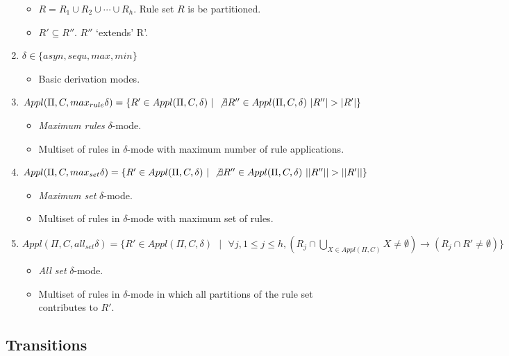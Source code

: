 \documentclass{article}
\newcommand{\s}{\text{ }}
\begin{document}
\begin{appendices}
\begin{enumerate}
\begin{itemize}
         \item $R = R_1 \cup R_2 \cup \cdots \cup R_h$. Rule set $R$ is be partitioned.
         \item $R' \subseteq R''$. $R''$ `extends' R'.
         \end{itemize}
   \item $\delta \in \{asyn, sequ, max, min\}$
         \begin{itemize}
         \item Basic derivation modes.
         \end{itemize}
   \item $Appl(\Pi, C, max_{rule}\delta) = \{R' \in Appl(\Pi, C, \delta) \s | \s \not\exists R'' \in Appl(\Pi,C, \delta) \s |R''| > |R'|\}$
         \begin{itemize}
         \item \textit{Maximum rules} $\delta$-mode.
         \item Multiset of rules in $\delta$-mode with maximum number of rule applications. 
         \end{itemize}
   \item $Appl(\Pi, C, max_{set}\delta) = \{R' \in Appl(\Pi, C, \delta) \s | \s \not\exists R'' \in Appl(\Pi,C, \delta) \s ||R''|| > ||R'||\}$
         \begin{itemize}
         \item \textit{Maximum set} $\delta$-mode.
         \item Multiset of rules in $\delta$-mode with maximum set of rules. 
         \end{itemize}
   \item $Appl(\Pi, C, all_{set}\delta) = \{R' \in Appl(\Pi, C, \delta) \s | \s \forall j, 1 \leq j \leq h, (R_j \cap \bigcup_{X \in Appl(\Pi,C)} X \neq \emptyset) \rightarrow (R_j \cap R' \neq \emptyset)\}$
         \begin{itemize}
         \item \textit{All set} $\delta$-mode.
         \item Multiset of rules in $\delta$-mode in which all partitions of the rule set contributes to $R'$. 
         \end{itemize}
\end{enumerate}


\subsection{Transitions} \label{a-ff1-transition}


\end{appendices}
\end{document}
